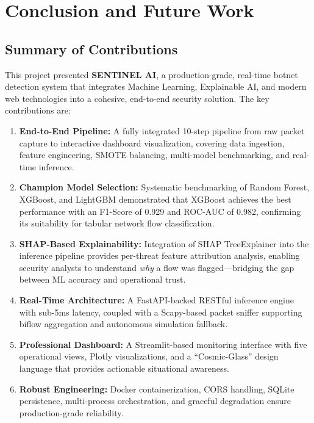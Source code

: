 \chapter{Conclusion and Future Work}

\section{Summary of Contributions}

This project presented \textbf{SENTINEL AI}, a production-grade, real-time botnet detection system that integrates Machine Learning, Explainable AI, and modern web technologies into a cohesive, end-to-end security solution. The key contributions are:

\begin{enumerate}
    \item \textbf{End-to-End Pipeline:} A fully integrated 10-step pipeline from raw packet capture to interactive dashboard visualization, covering data ingestion, feature engineering, SMOTE balancing, multi-model benchmarking, and real-time inference.

    \item \textbf{Champion Model Selection:} Systematic benchmarking of Random Forest, XGBoost, and LightGBM demonstrated that XGBoost achieves the best performance with an F1-Score of 0.929 and ROC-AUC of 0.982, confirming its suitability for tabular network flow classification.

    \item \textbf{SHAP-Based Explainability:} Integration of SHAP TreeExplainer into the inference pipeline provides per-threat feature attribution analysis, enabling security analysts to understand \textit{why} a flow was flagged---bridging the gap between ML accuracy and operational trust.

    \item \textbf{Real-Time Architecture:} A FastAPI-backed RESTful inference engine with sub-5ms latency, coupled with a Scapy-based packet sniffer supporting biflow aggregation and autonomous simulation fallback.

    \item \textbf{Professional Dashboard:} A Streamlit-based monitoring interface with five operational views, Plotly visualizations, and a ``Cosmic-Glass'' design language that provides actionable situational awareness.

    \item \textbf{Robust Engineering:} Docker containerization, CORS handling, SQLite persistence, multi-process orchestration, and graceful degradation ensure production-grade reliability.
\end{enumerate}

